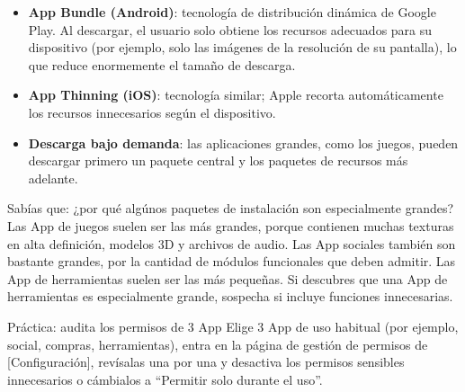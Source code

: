 \begin{itemize}
  \item \textbf{App Bundle (Android)}: tecnología de distribución dinámica de Google Play. Al descargar, el usuario solo obtiene los recursos adecuados para su dispositivo (por ejemplo, solo las imágenes de la resolución de su pantalla), lo que reduce enormemente el tamaño de descarga.
  \item \textbf{App Thinning (iOS)}: tecnología similar; Apple recorta automáticamente los recursos innecesarios según el dispositivo.
  \item \textbf{Descarga bajo demanda}: las aplicaciones grandes, como los juegos, pueden descargar primero un paquete central y los paquetes de recursos más adelante.
\end{itemize}

\begin{tcbinfo}{Sabías que: ¿por qué algúnos paquetes de instalación son especialmente grandes?}
Las App de juegos suelen ser las más grandes, porque contienen muchas texturas en alta definición, modelos 3D y archivos de audio. Las App sociales también son bastante grandes, por la cantidad de módulos funcionales que deben admitir. Las App de herramientas suelen ser las más pequeñas. Si descubres que una App de herramientas es especialmente grande, sospecha si incluye funciones innecesarias.

\end{tcbinfo}

\begin{tcbpractice}{Práctica: audita los permisos de 3 App}
Elige 3 App de uso habitual (por ejemplo, social, compras, herramientas), entra en la página de gestión de permisos de [Configuración], revísalas una por una y desactiva los permisos sensibles innecesarios o cámbialos a “Permitir solo durante el uso”.

\end{tcbpractice}
